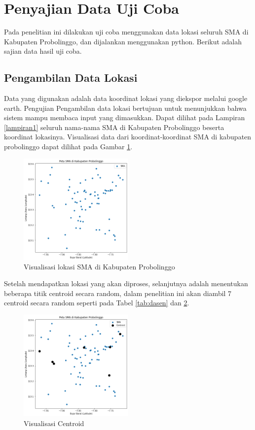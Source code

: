 \section{Penyajian Data Uji Coba}

Pada penelitian ini dilakukan uji coba menggunakan data lokasi seluruh SMA di Kabupaten Probolinggo, dan dijalankan menggunakan python. Berikut adalah sajian data hasil uji coba.

\subsection{Pengambilan Data Lokasi}

Data yang digunakan adalah data koordinat lokasi yang diekspor melalui google earth. Pengujian Pengambilan data lokasi bertujuan untuk menunjukkan bahwa sistem 
mampu membaca input yang dimasukkan. Dapat dilihat pada Lampiran \ref{lampiran1} seluruh nama-nama SMA di Kabupaten Probolinggo beserta koordinat lokasinya. Visualisasi data dari koordinat-koordinat SMA di kabupaten probolinggo dapat dilihat pada Gambar \ref{fig:petasma}.

\begin{figure}[h!]
  \centering
  \includegraphics[width=0.5\textwidth]{peta sma.png}
  \caption{Visualisasi lokasi SMA di Kabupaten Probolinggo}
  \label{fig:petasma}
\end{figure}

Setelah mendapatkan lokasi yang akan diproses, selanjutnya adalah menentukan beberapa titik centroid secara random, dalam penelitian ini akan diambil 7 centroid secara random seperti pada Tabel \ref{tab:dasen} dan \ref{fig:visdasen}.



\begin{figure}[h!]
	\centering
	\includegraphics[width=0.5\textwidth]{titik centroid.png}
	\caption{Visualisasi Centroid}
	\label{fig:visdasen}
\end{figure}

